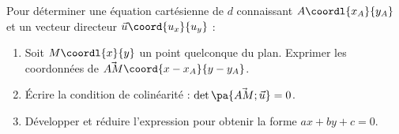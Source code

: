 \begin{methode}
	Pour déterminer une équation cartésienne de $d$ connaissant $A\coordl{x_A}{y_A}$ et un vecteur directeur $\vec{u}\coord{u_x}{u_y}$ :

	\begin{enumerate}
		\item Soit $M\coordl{x}{y}$ un point quelconque du plan. Exprimer les coordonnées de $\vec{AM}\coord{x - x_A}{y - y_A}$.
		\item Écrire la condition de colinéarité : $\det\pa{\vec{AM};\vec{u}} = 0$.
		\item Développer et réduire l'expression pour obtenir la forme $ax + by + c = 0$.
	\end{enumerate}
\end{methode}

